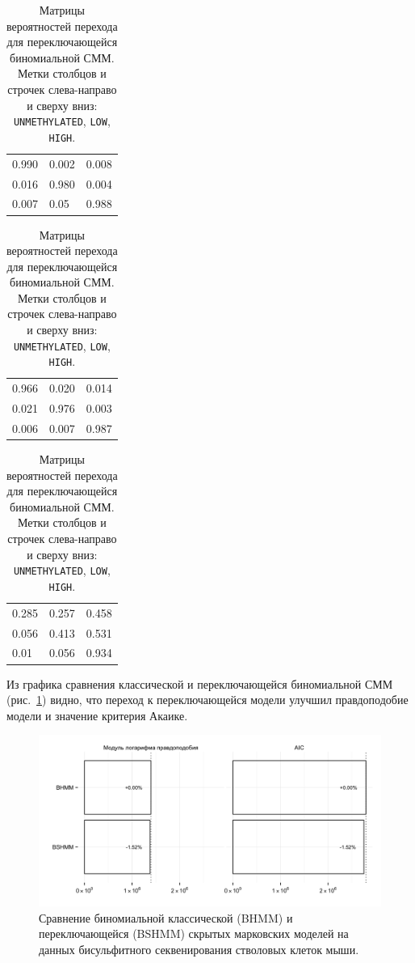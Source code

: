 \begin{table}[htbp!]
  \centering
  \begin{subtable}{.3\textwidth}
    \centering
    \begin{tabular}{lll}
      0.990 & 0.002 & 0.008 \\
      0.016 & 0.980 & 0.004 \\
      0.007 & 0.05 & 0.988
    \end{tabular}
    \caption{$\op{w}(d_t) = 1, d_t \in [1, 2]$}
  \end{subtable}\hspace{.025\textwidth}%
  \begin{subtable}{.3\textwidth}
    \centering
    \begin{tabular}{lll}
      0.966 & 0.020 & 0.014 \\
      0.021 & 0.976 & 0.003 \\
      0.006 & 0.007 & 0.987
    \end{tabular}
    \caption{$\op{w}(d_t) = 5, d_t \in [6, 9]$}
  \end{subtable}\hspace{.025\textwidth}%
  \begin{subtable}{.3\textwidth}
    \centering
    \begin{tabular}{lll}
      0.285 & 0.257 & 0.458 \\
      0.056 & 0.413 & 0.531 \\
      0.01  & 0.056 & 0.934
    \end{tabular}
    \caption{$\op{w}(d_t) = 9, d_t \ge 118$}
  \end{subtable}

  \caption{Матрицы вероятностей перехода для переключающейся биномиальной СММ.
    Метки столбцов и строчек слева-направо и сверху вниз: \texttt{UNMETHYLATED},
    \texttt{LOW}, \texttt{HIGH}.}
  \label{tab:trans}
\end{table}

Из графика сравнения классической и переключающейся биномиальной СММ
(рис.~\ref{fig:bhmm-bshmm}) видно, что переход к переключающейся модели улучшил
правдоподобие модели и значение критерия Акаике.

\begin{figure}[htbp!]
  \centering
  \includegraphics[width=\textwidth]{images/bhmm-bshmm}
  \caption{Сравнение биномиальной классической (BHMM) и переключающейся (BSHMM)
    скрытых марковских моделей на данных бисульфитного секвенирования
    стволовых клеток мыши.}
  \label{fig:bhmm-bshmm}
\end{figure}


